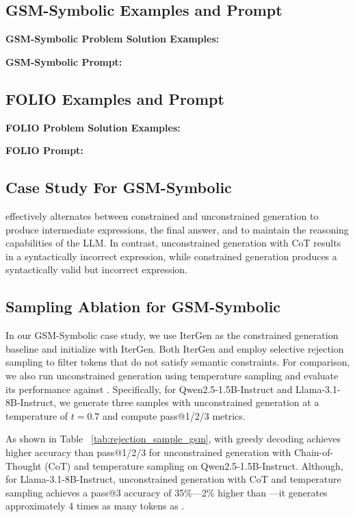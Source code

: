 





\subsection{GSM-Symbolic Examples and Prompt}
\label{sec:gsm_info}
\textbf{GSM-Symbolic Problem Solution Examples:}

\textbf{GSM-Symbolic Prompt:}



\subsection{FOLIO Examples and Prompt}
\label{sec:folio_info}
\textbf{FOLIO Problem Solution Examples:}

\textbf{FOLIO Prompt:}



\newpage
\subsection{Case Study For GSM-Symbolic}


\Tool{} effectively alternates between constrained and unconstrained generation to produce intermediate expressions, the final answer, and to maintain the reasoning capabilities of the LLM. In contrast, unconstrained generation with CoT results in a syntactically incorrect expression, while constrained generation produces a syntactically valid but incorrect expression.

\subsection{Sampling Ablation for GSM-Symbolic}
In our GSM-Symbolic case study, we use IterGen as the constrained generation baseline and initialize \Tool{} with IterGen. Both IterGen and \Tool{} employ selective rejection sampling to filter tokens that do not satisfy semantic constraints. For comparison, we also run unconstrained generation using temperature sampling and evaluate its performance against \Tool{}. Specifically, for Qwen2.5-1.5B-Instruct and Llama-3.1-8B-Instruct, we generate three samples with unconstrained generation at a temperature of \( t = 0.7 \) and compute pass@1/2/3 metrics. 

As shown in Table ~\ref{tab:rejection_sample_gsm}, \Tool{} with greedy decoding achieves higher accuracy than pass@1/2/3 for unconstrained generation with Chain-of-Thought (CoT) and temperature sampling on Qwen2.5-1.5B-Instruct. Although, for Llama-3.1-8B-Instruct, unconstrained generation with CoT and temperature sampling achieves a pass@3 accuracy of 35\%—2\% higher than \Tool{}—it generates approximately 4 times as many tokens as \Tool{}.

